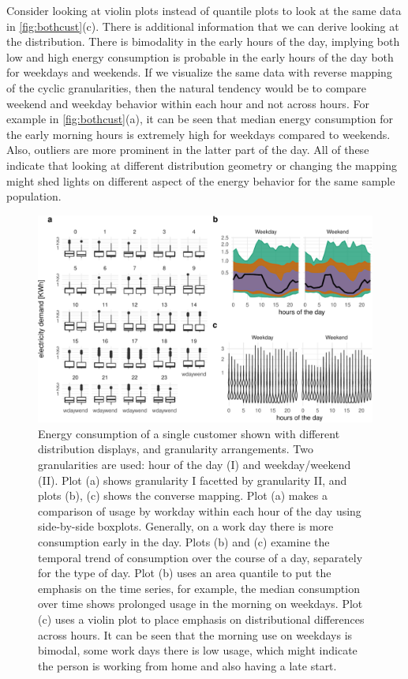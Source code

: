 \documentclass[
]{article}
\begin{document}
Consider looking at violin plots instead of quantile plots to look at the same data in \autoref{fig:bothcust}(c). There is additional information that we can derive looking at the distribution. There is bimodality in the early hours of the day, implying both low and high energy consumption is probable in the early hours of the day both for weekdays and weekends. If we visualize the same data with reverse mapping of the cyclic granularities, then the natural tendency would be to compare weekend and weekday behavior within each hour and not across hours. For example in \autoref{fig:bothcust}(a), it can be seen that median energy consumption for the early morning hours is extremely high for weekdays compared to weekends. Also, outliers are more prominent in the latter part of the day. All of these indicate that looking at different distribution geometry or changing the mapping might shed lights on different aspect of the energy behavior for the same sample population.

\begin{figure}

{\centering \includegraphics[width=0.9\linewidth]{figure/bothcust-1} 

}

\caption{Energy consumption of a single customer shown with different distribution displays, and granularity arrangements. Two granularities are used: hour of the day (I) and weekday/weekend (II). Plot (a) shows granularity I facetted by granularity II, and plots (b), (c) shows the converse mapping. Plot (a) makes a comparison of usage by workday within each hour of the day using side-by-side boxplots. Generally, on a work day there is more consumption early in the day.  Plots (b) and (c) examine the temporal trend of consumption over the course of a day, separately for the type of day. Plot (b) uses an area quantile to put the emphasis on the time series, for example, the median consumption over time shows prolonged usage in the morning on weekdays. Plot (c) uses a violin plot to place emphasis on distributional differences across hours. It can be seen that the morning use on weekdays is bimodal, some work days there is low usage, which might indicate the person is working from home and also having a late start.}\label{fig:bothcust}
\end{figure}
\end{document}
